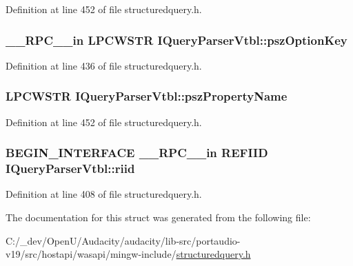 Definition at line 452 of file structuredquery.\+h.

\subsubsection[{\texorpdfstring{psz\+Option\+Key}{pszOptionKey}}]{ {\bf \+\_\+\+\_\+\+R\+P\+C\+\_\+\+\_\+in} {\bf L\+P\+C\+W\+S\+TR} I\+Query\+Parser\+Vtbl\+::psz\+Option\+Key}\hypertarget{struct_i_query_parser_vtbl_a69a2c48bfa55fc900b1c22fb47d23b6a}{}\label{struct_i_query_parser_vtbl_a69a2c48bfa55fc900b1c22fb47d23b6a}


Definition at line 436 of file structuredquery.\+h.

\subsubsection[{\texorpdfstring{psz\+Property\+Name}{pszPropertyName}}]{ {\bf L\+P\+C\+W\+S\+TR} I\+Query\+Parser\+Vtbl\+::psz\+Property\+Name}\hypertarget{struct_i_query_parser_vtbl_a22d47d249bdbd6d444e2d6af5b44f031}{}\label{struct_i_query_parser_vtbl_a22d47d249bdbd6d444e2d6af5b44f031}


Definition at line 452 of file structuredquery.\+h.

\subsubsection[{\texorpdfstring{riid}{riid}}]{\setlength{\rightskip}{0pt plus 5cm}B\+E\+G\+I\+N\+\_\+\+I\+N\+T\+E\+R\+F\+A\+CE {\bf \+\_\+\+\_\+\+R\+P\+C\+\_\+\+\_\+in} {\bf R\+E\+F\+I\+ID} I\+Query\+Parser\+Vtbl\+::riid}\hypertarget{struct_i_query_parser_vtbl_acf02375daea99e2ef4dbe5987e20307b}{}\label{struct_i_query_parser_vtbl_acf02375daea99e2ef4dbe5987e20307b}


Definition at line 408 of file structuredquery.\+h.



The documentation for this struct was generated from the following file\+:\begin{DoxyCompactItemize}
\item 
C\+:/\+\_\+dev/\+Open\+U/\+Audacity/audacity/lib-\/src/portaudio-\/v19/src/hostapi/wasapi/mingw-\/include/\hyperlink{structuredquery_8h}{structuredquery.\+h}\end{DoxyCompactItemize}

